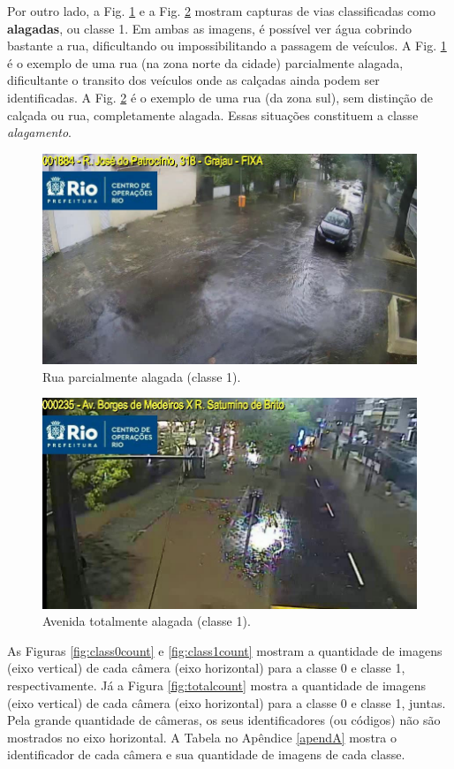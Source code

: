 Por outro lado, a Fig. \ref{fig:class1_1} e a Fig. \ref{fig:class1_2} mostram capturas de vias classificadas como \textbf{alagadas}, ou classe 1. 
Em ambas as imagens, é possível ver água cobrindo bastante a rua, dificultando ou impossibilitando a passagem de veículos. 
A Fig. \ref{fig:class1_1} é o exemplo de uma rua (na zona norte da cidade) parcialmente alagada, dificultante o transito dos veículos onde as calçadas ainda podem ser identificadas. 
A Fig. \ref{fig:class1_2} é o exemplo de uma rua (da zona sul), sem distinção de calçada ou rua, completamente alagada. Essas situações constituem a classe \textit{alagamento}. 

\begin{figure}[htb]
\centerline{\includegraphics[width=0.8\linewidth]{images/1/CODE1884 2023-08-20 12-56-29-9.jpg}}
\caption{Rua parcialmente alagada (classe 1).}
\label{fig:class1_1}
\end{figure}

\begin{figure}[htb]
\centerline{\includegraphics[width=0.8\linewidth]{images/1/CODE235 2023-02-07 20-11-08-9.jpg}}
\caption{Avenida totalmente alagada (classe 1).}
\label{fig:class1_2}
\end{figure}

As Figuras \ref{fig:class0count} e \ref{fig:class1count} mostram a quantidade de imagens (eixo vertical) de cada câmera (eixo horizontal) para a classe 0 e classe 1, respectivamente.
Já a Figura \ref{fig:totalcount} mostra a quantidade de imagens (eixo vertical) de cada câmera (eixo horizontal) para a classe 0 e classe 1, juntas.
Pela grande quantidade de câmeras, os seus identificadores (ou códigos) não são mostrados no eixo horizontal. A Tabela no Apêndice \ref{apendA} mostra o identificador de cada câmera e sua quantidade de imagens de cada classe.

